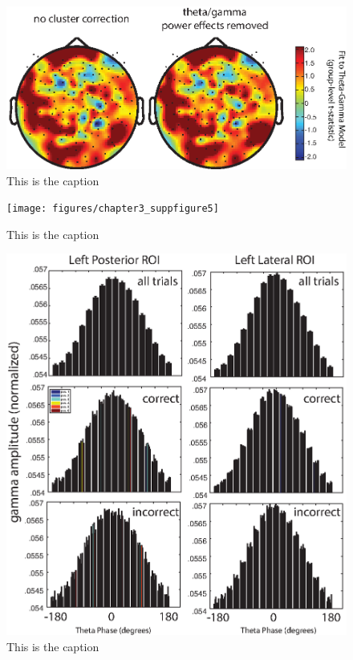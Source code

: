\begin{figure}[htbp]
\centering
\includegraphics{figures/chapter3_suppfigure4}
\caption{This is the caption}
\end{figure}

\begin{figure}[htbp]
\centering
\texttt{[image: figures/chapter3\_suppfigure5]}
\caption{This is the caption}
\end{figure}

\begin{figure}[htbp]
\centering
\includegraphics{figures/chapter3_suppfigure6}
\caption{This is the caption}
\end{figure}

